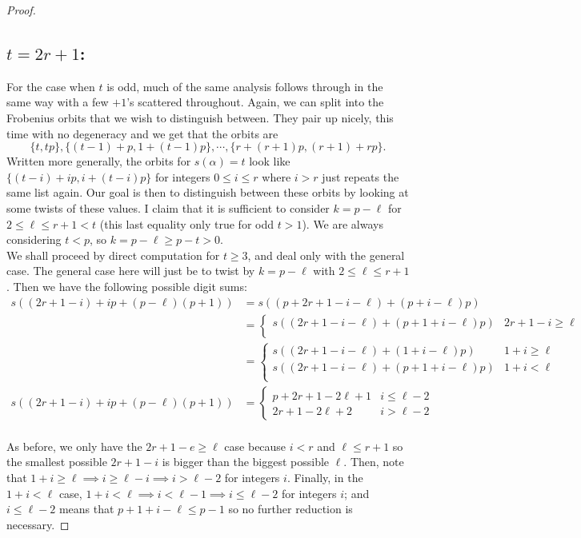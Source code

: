 \documentclass[12pt]{article}
\theoremstyle{customtheorem}%
\theoremstyle{remark}
\theoremstyle{definition}
\numberwithin{equation}{section}
\numberwithin{theorem}{section}
\begin{document}
\begin{proof}
\subsection{$t = 2r+1$:}
For the case when $t$ is odd, much of the same analysis follows through in the same way with a few $+1$'s scattered throughout.
Again, we can split into the Frobenius orbits that we wish to distinguish between. 
They pair up nicely, this time with no degeneracy and we get that the orbits are \[\{t, tp\}, \{(t-1)+p, 1+(t-1)p\}, \cdots, \{r + (r+1) p, (r+1) + r p\}.\] 
Written more generally, the orbits for $s(\alpha) = t$ look like $\{(t-i) + ip, i + (t-i)p\}$ for integers $0 \leq i \leq r $ where $i > r$ just repeats the same list again.
Our goal is then to distinguish between these orbits by looking at some twists of these values.
I claim that it is sufficient to consider $k = p - \ell$ for $2 \leq \ell \leq r + 1 < t$ (this last equality only true for odd $t > 1$).
We are always considering $t < p$, so $k = p - \ell \geq p - t > 0$.
\\

We shall proceed by direct computation for $t \geq 3$, and deal only with the general case.
The general case here will just be to twist by $k = p- \ell$ with $2 \leq \ell \leq r+1$. 
Then we have the following possible digit sums:
\begin{align*}
s((2r+1-i) + ip + (p - \ell)(p+1)) &= s((p + 2r+1 - i - \ell) + (p + i -\ell)p) \\ 
&=\begin{cases}
  s((2r +1- i - \ell) + (p + 1 + i -\ell)p) & 2r+1-i  \geq \ell \\
\end{cases}\\
&=\begin{cases}
  s((2r + 1 - i - \ell) + ( 1 + i -\ell)p) &  1+i \geq \ell \\
  s((2r +1- i - \ell) + (p + 1 + i -\ell)p) & 1 + i < \ell \\
\end{cases} \\
s((2r+1-i)+ip + (p-\ell)(p+1))
&= \begin{cases}
  p+2r+1-2\ell + 1 & i \leq \ell - 2 \\
  2r+1-2\ell + 2 & i > \ell -2
\end{cases}
\end{align*}
\\

As before, we only have the $2r+1-e \geq \ell$ case because $i < r$ and $\ell \leq r+1$ so the smallest possible $2r+1-i$ is bigger than the biggest possible $\ell$.
Then, note that $1 + i \geq \ell \implies i \geq \ell - i \implies i > \ell -2$ for integers $i$.
Finally, in the $1 + i < \ell$ case, $1 + i < \ell \implies i < \ell -1 \implies i \leq \ell -2$ for integers $i$; and $i \leq \ell -2$ means that $p + 1 + i - \ell \leq p-1$ so no further reduction is necessary.






\end{proof}
\end{document}
